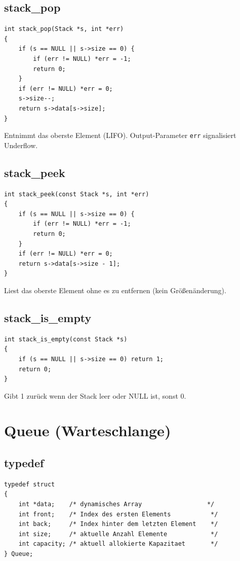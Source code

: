 \documentclass[10pt, a4paper]{article}
\begin{document}
\subsection{stack\_pop}
\begin{lstlisting}
int stack_pop(Stack *s, int *err)
{
    if (s == NULL || s->size == 0) {
        if (err != NULL) *err = -1;
        return 0;
    }
    if (err != NULL) *err = 0;
    s->size--;
    return s->data[s->size];
}
\end{lstlisting}
Entnimmt das oberste Element (LIFO). Output-Parameter \texttt{err} signalisiert Underflow.

\subsection{stack\_peek}
\begin{lstlisting}
int stack_peek(const Stack *s, int *err)
{
    if (s == NULL || s->size == 0) {
        if (err != NULL) *err = -1;
        return 0;
    }
    if (err != NULL) *err = 0;
    return s->data[s->size - 1];
}
\end{lstlisting}
Liest das oberste Element ohne es zu entfernen (kein Gr\"o\ss en\"anderung).

\subsection{stack\_is\_empty}
\begin{lstlisting}
int stack_is_empty(const Stack *s)
{
    if (s == NULL || s->size == 0) return 1;
    return 0;
}
\end{lstlisting}
Gibt 1 zur\"uck wenn der Stack leer oder NULL ist, sonst 0.

\newpage
\section{Queue (Warteschlange)}

\subsection{typedef}
\begin{lstlisting}
typedef struct
{
    int *data;    /* dynamisches Array                  */
    int front;    /* Index des ersten Elements           */
    int back;     /* Index hinter dem letzten Element    */
    int size;     /* aktuelle Anzahl Elemente            */
    int capacity; /* aktuell allokierte Kapazitaet       */
} Queue;
\end{lstlisting}
\end{document}
